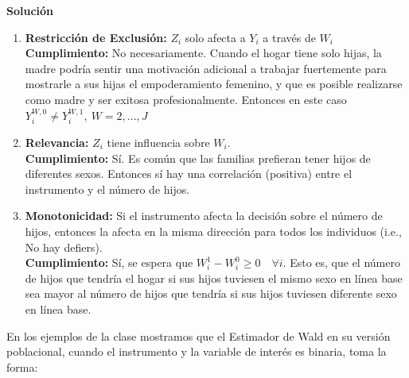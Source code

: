 \documentclass[a4paper, answers, addpoints, 11pt]{exam}
\newenvironment{solucion}{%
  \begin{mdframed}[
    backgroundcolor=blue!5,    %
    linecolor=blue!50,          %
    linewidth=2pt,              %
    leftmargin=10pt,            %
    rightmargin=8pt,           %
    topline=true,              %
    bottomline=true,            %
    roundcorner=10pt,           %
    innerleftmargin=10pt,       %
    innerrightmargin=10pt,      %
    innerbottommargin=10pt,     %
    innertopmargin=10pt         %
  ]%
  \begin{tcolorbox}[colframe=blue!50!black, colback=blue!50, coltitle=white, sharp corners=all, boxrule=1mm, width=\textwidth, halign=left, valign=center, top=0mm, bottom=0mm, left=0mm, right=0mm] \textbf{Solución} \end{tcolorbox} }{\end{mdframed}}
\begin{document}
\begin{enumerate}
\begin{solucion}
\begin{enumerate}
    
    \item \textbf{Restricci\'on de Exclusi\'on:}  $Z_i$ solo afecta a $Y_i$ a trav\'es de $W_i$
     \\
    \textbf{Cumplimiento:} No necesariamente.  Cuando el hogar tiene solo hijas, la madre podría sentir una motivación adicional a trabajar fuertemente para mostrarle a sus hijas el empoderamiento femenino, y que es posible realizarse como madre y ser exitosa profesionalmente. Entonces en este caso $Y_i^{W,0} \neq Y_i^{W,1},\: W=2,..., J$
    
    \item \textbf{Relevancia:}  $Z_i$ tiene influencia sobre $W_i$. 
     \\
    \textbf{Cumplimiento:} Sí. Es común que las familias prefieran tener hijos de diferentes sexos. Entonces sí hay una correlación (positiva) entre el instrumento y el número de hijos.
    

    \item \textbf{Monotonicidad:} Si el instrumento afecta la decisi\'on sobre el número de hijos, entonces la afecta en la misma direcci\'on para todos los individuos (i.e., No hay defiers). \\
    \textbf{Cumplimiento:} Sí, se espera que $ W_i^1 - W_i^0 \geq 0 \quad \forall i$. Esto es, que el número de hijos que tendría el hogar si sus hijos tuviesen el mismo sexo en línea base sea mayor al número de hijos que tendría si sus hijos tuviesen diferente sexo en línea base.
\end{enumerate}
\end{solucion}
\end{enumerate}




En los ejemplos de la clase mostramos que el Estimador de Wald en su versión poblacional, cuando el instrumento y la variable de interés es binaria, toma la forma: 
\end{document}
